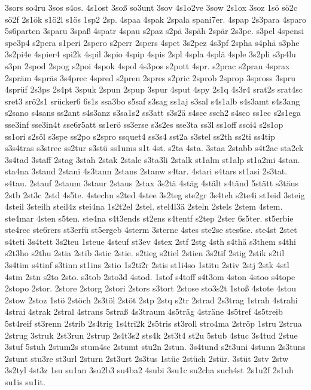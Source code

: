 {3sors
so4ru
3sos
s4os.
4s1ost
3soß
so3unt
3sov
4s1o2ve
3sow
2s1ox
3soz
1sö
sö2c
sö2f
2s1ök
s1ö2l
s1ös
1sp2
2sp.
4spaa
4spak
2spala
spani7er.
4spap
2s3para
4sparo
5s6parten
3sparu
3spaß
4spatr
4spau
s2paz
s2pä
3späh
2spär
2s3pe.
s3pel
4spensi
spe3p4
s2pera
s1peri
2spero
s2perr
2spers
4spet
3s2pez
4s3pf
2spha
s4phä
s3phe
3s2pi4e
4spier4
spi2k
4spil
3spio
4spip
4spis
2spl
4spla
4splä
4sple
3s2pli
s3p4lu
s3pn
2spod
2spog
s2poi
4spok
4spol
4s3pos
s2pott
4spr.
s2prac
s2pran
4sprax
2spräm
4spräs
3s4prec
4spred
s2pren
2spres
s2pric
2sprob
2sprop
3spross
3spru
4sprüf
2s3ps
2s4pt
3spuk
2spun
2spup
3spur
4sput
4spy
2s1q
4s3r4
srat2s
srat4sc
sret3
srö2s1
srücker6
6s1s
ssa3bo
s5saf
s3sag
ss1aj
s3sal
s4s1alb
s4s3amt
s4s3ang
s2sano
s4sans
ss2ant
s4s3anz
s3sa1s2
ss3att
s3s2ä
s4sce
ssch2
s4sco
ss1ec
s2s1ega
sse3inf
sse3in4t
sse6r5att
ss1erö
ss3erse
s3s2es
sse3ta
ss3l
ss1off
ssoi4
s2s1op
ss1ori
s2söl
s3spe
ss2po
s2spro
ssquet4
ss3s4
sst2a
s3stel
ss2th
ss2ti
ss4tip
s3s4tras
s3strec
ss2tur
s3stü
ss1ums
s1t
4st.
s2ta
4sta.
3staa
2stabb
s4t2ac
sta2ck
3s4tad
3staff
2stag
3stah
2stak
2stale
s3ta3li
2stalk
st1alm
st1alp
st1a2mi
4stan.
sta4na
3stand
2stani
4s3tann
2stans
2stanw
s4tar.
4stari
s4tars
st1asi
2s3tat.
s4tau.
2stauf
2staum
3staur
2staus
2stax
3s2tä
4stäg
4stält
s4tänd
5stätt
s3täus
2stb
2st3c
2std
4s5te.
4stechn
s2ted
4stee
3s2teg
ste2gr
3s4teh
s2te4i
st1eid
3steig
4steil
3steilh
steil4z
stei4na
1s2t2el
2stel.
stel4l3ä
2steln
2stels
2stem
4stem.
ste4mar
4sten
s5ten.
ste4na
s4t3ends
st2ens
s4tentf
s2tep
2ster
6s5ter.
st5erbie
ste4rec
ste6rers
st3erfü
st5ergeb
4sterm
3sternc
4stes
ste2se
stes6se.
ste4st
2stet
s4teti
3s4tett
3s2teu
1steue
4steuf
st3ev
4stex
2stf
2stg
4sth
s4thä
s3them
s4thi
s2t3ho
s2thu
2stia
2stib
3stic
2stie.
s2tieg
s2tiel
2stien
3s2tif
2stig
2stik
s2til
3s4tim
s4tinf
s3tinn
st1ins
2stio
1s2ti2r
2stis
st1i4so
1stitu
2stiv
2stj
2stk
4stl
4stm
2stn
s2to
2sto.
s3tob
2sto3d
4stod.
1stof
s4toff
s4t3om
4ston
4stoo
s4tope
2stopo
2stor.
2store
2storg
2stori
2stors
s3tort
2stose
sto3s2t
1stoß
4stote
4stou
2stow
2stoz
1stö
2stöch
2s3töl
2stöt
2stp
2stq
s2tr
2strad
2s3trag
1strah
4strahi
4strai
4strak
2stral
4strans
5straß
4s3traum
4s5träg
4sträne
4s5tref
4s5treib
5st4reif
st3renn
2strib
2s4trig
1s4tri2k
2s5tris
st3roll
stro4ma
2ströp
1stru
2strua
2strug
3struk
2st3run
2strup
2s4t3s2
sts4k
2st3t4
st2u
5stub
4stuc
3s4tud
2stue
3stuf
5stuh
2stum2s
stum4sc
2stumt
stu2n
2stun.
3s4tund
s2t3uni
4stunn
2s3tuns
2stunt
stu3re
st3url
2sturn
2st3urt
2s3tus
1stüc
2stüch
2stür.
3stüt
2stv
2stw
3s2tyl
4st3z
1su
su1an
3su2b3
su4ba2
4subi
3su1c
su2cha
such4st
2s1u2f
2s1uh
su1is
su1it.
}

